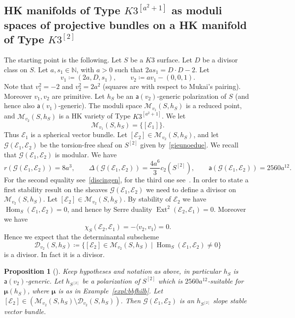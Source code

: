 \documentclass[11pt]{amsart}
\newcommand{\NN}{{\mathbb N}}
\let\mathcal\mathscr
\def\cD{\mathcal{D}}
\def\cE{\mathcal{E}}
\def\cG{\mathcal{G}}
\def\cM{\mathcal{M}}
\DeclareMathOperator{\Ext}{Ext}
\DeclareMathOperator{\Hom}{Hom}
\newcommand{\la}{\langle}
\newcommand{\ra}{\rangle}
\newtheorem{prp}[lmm]{Proposition}
\theoremstyle{definition}
\theoremstyle{remark}
\begin{document}
\subsection{HK manifolds of Type $K3^{[a^2+1]}$ as moduli spaces of projective bundles on a HK manifold  of Type $K3^{[2]}$}\label{subsec:lavoroinfinito}
%
%
\setcounter{equation}{0}
%
The starting point is the following. Let $S$ be a $K3$ surface. Let  $D$ be a divisor class on $S$.
Let $a,s_1\in\NN$, with $a>0$ such that $2as_1=D\cdot D-2$. Let
%
\begin{equation}
%
v_1\coloneqq\left(2a,D,s_1\right),\qquad v_2\coloneqq av_1-(0,0,1).
%
\end{equation}
%
Note that $v_1^2=-2$ and $v_2^2=2a^2$ (squares are with respect to Mukai's pairing). Moreover  $v_1,v_2$ are primitive.
Let $h_S$ be an ${\mathsf a}(v_2)$-generic polarization of $S$ (and hence also ${\mathsf a}(v_1)$-generic). The moduli space 
$\cM_{v_1}(S,h_S)$ is a reduced point, and  $\cM_{v_2}(S,h_S)$ is a HK variety of Type $K3^{[a^2+1]}$. We let
%
\begin{equation}
%
\cM_{v_1}(S,h_S)=\{[\cE_1]\}.
%
\end{equation}
%
Thus $\cE_1$ is a spherical vector bundle.
Let  $[\cE_2]\in \cM_{v_2}(S,h_S)$, and let $\cG(\cE_1,\cE_2)$ be the torsion-free sheaf on $S^{[2]}$ given by~\eqref{gieunoedue}. We recall that 
$\cG(\cE_1,\cE_2)$ is modular. We have 
%
\begin{equation}\label{sanmichele}
%
r(\cG(\cE_1,\cE_2)) =8a^3,\qquad \Delta(\cG(\cE_1,\cE_2)) =\frac{ 4a^6}{3} c_2(S^{[2]}),\qquad 
{\mathsf a}(\cG(\cE_1,\cE_2)) =2560 a^{12}. 
%
\end{equation}
%
For the second equality see~\eqref{discingen}, for the third one see~\cite[Expl.~2.14]{og:highdim}. In order to state a  first stability result on the sheaves $\cG(\cE_1,\cE_2)$ we need to define a divisor on $\cM_{v_2}(S,h_S)$. Let $[\cE_2]\in\cM_{v_2}(S,h_S)$. By stability of $\cE_2$ we have $\Hom_S(\cE_1,\cE_2)=0$, and hence by Serre duality $\Ext^2(\cE_2,\cE_1)=0$.
Moreover we have
%
\begin{equation}
%
\chi_S(\cE_2,\cE_1)=-\la v_2,v_1\ra=0.
%
\end{equation}
%
Hence we expect that the determinantal subscheme
%
\begin{equation}
%
\cD_{v_2}(S,h_S)\coloneqq\{[\cE_2]\in\cM_{v_2}(S,h_S) \mid \Hom_S(\cE_1,\cE_2)\not=0\}
%
\end{equation}
%
is a divisor. In fact it is a divisor. 
%
\begin{prp}[\cite{og:genhk}]\label{prp:stabuno}
% 
Keep hypotheses and notation  as above, in particular $h_S$ is ${\mathsf a}(v_2)$-generic.  Let  $ h_{S^{[2]}}$ be a polarization of $S^{[2]}$ which is $2560 a^{12}$-suitable for $\bm{\mu}(h_S)$, where $\bm{\mu}$ is as in Example~\ref{expl:bbfhilb}. 
Let $[\cE_2]\in(\cM_{v_2}(S,h_S)\setminus \cD_{v_2}(S,h_S)) $.  Then 
$\cG(\cE_1,\cE_2)$ is an $h_{S^{[2]}}$ slope stable vector bundle. 
%
\end{prp}
\end{document}
